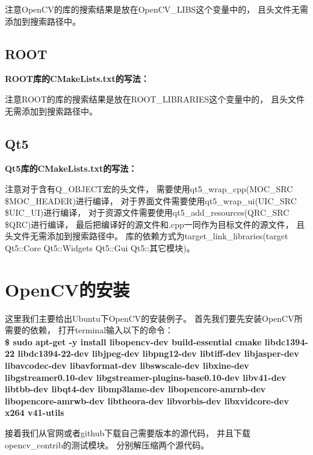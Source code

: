 注意OpenCV的库的搜索结果是放在OpenCV\_LIBS这个变量中的，%
且头文件无需添加到搜索路径中。%

\subsection{ROOT}
\noindent\textbf{\color{magenta}ROOT库的CMakeLists.txt的写法：}

注意ROOT的库的搜索结果是放在ROOT\_LIBRARIES这个变量中的，%
且头文件无需添加到搜索路径中。%

\subsection{Qt5}
\noindent\textbf{\color{magenta}Qt5库的CMakeLists.txt的写法：}

注意对于含有Q\_OBJECT宏的头文件，%
需要使用qt5\_wrap\_cpp(MOC\_SRC \${MOC\_HEADER})进行编译，%
对于界面文件需要使用qt5\_wrap\_ui(UIC\_SRC \${UIC\_UI})进行编译，%
对于资源文件需要使用qt5\_add\_resources(QRC\_SRC \${QRC})进行编译，%
最后把编译好的源文件和\*.cpp一同作为目标文件的源文件，%
且头文件无需添加到搜索路径中。%
库的依赖方式为target\_link\_libraries(target Qt5::Core Qt5::Widgets Qt5::Gui Qt5::其它模块)。





\section{OpenCV的安装}
这里我们主要给出Ubuntu下OpenCV的安装例子。%
首先我们要先安装OpenCV所需要的依赖，%
打开terminal输入以下的命令：\\
\textbf{\color{magenta}\$ sudo apt-get -y install libopencv-dev 
   build-essential 
   cmake 
   libdc1394-22 
   libdc1394-22-dev 
   libjpeg-dev 
   libpng12-dev 
   libtiff-dev 
   libjasper-dev 
   libavcodec-dev 
   libavformat-dev 
   libswscale-dev 
   libxine-dev  
   libgstreamer0.10-dev 
   libgstreamer-plugins-base0.10-dev 
   libv41-dev 
   libtbb-dev 
   libqt4-dev 
   libmp3lame-dev 
   libopencore-amrnb-dev 
   libopencore-amrwb-dev 
   libtheora-dev 
   libvorbis-dev 
   libxvidcore-dev 
   x264 
   v41-utils}

 接着我们从官网或者github下载自己需要版本的源代码，%
 并且下载opencv\_contrib的测试模块。%
 分别解压缩两个源代码。%
 
